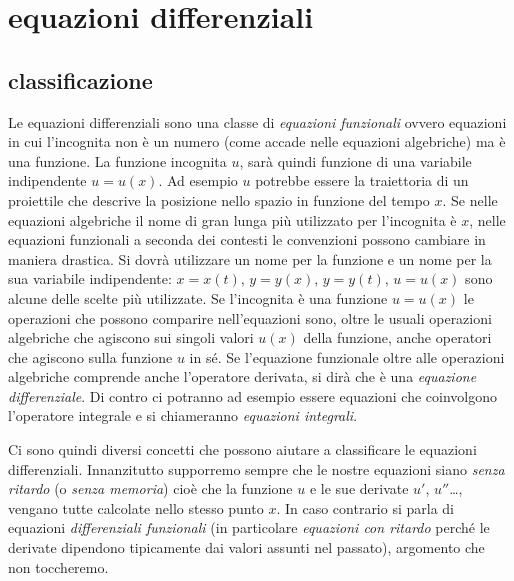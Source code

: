 \chapter{equazioni differenziali}
\label{ch:edo}

\section{classificazione}

Le equazioni differenziali sono una classe di \emph{equazioni funzionali}
ovvero
equazioni in cui l'incognita non è un numero (come accade nelle equazioni algebriche) ma è una funzione. La funzione incognita $u$, sarà quindi funzione di una variabile indipendente $u=u(x)$.
Ad esempio $u$ potrebbe essere la traiettoria di un proiettile che descrive la posizione nello spazio in funzione del tempo $x$. Se nelle equazioni algebriche il nome di gran lunga più utilizzato per l'incognita è $x$, nelle equazioni funzionali a seconda dei contesti le convenzioni possono cambiare in maniera drastica. Si dovrà utilizzare un nome per la funzione e un nome per la sua variabile indipendente: $x=x(t)$, $y=y(x)$, $y=y(t)$, $u=u(x)$ sono alcune delle scelte più utilizzate.
Se l'incognita è una funzione $u=u(x)$ le operazioni che possono comparire nell'equazioni sono,
oltre le usuali operazioni algebriche che agiscono sui singoli valori $u(x)$ della funzione,
anche operatori che agiscono sulla funzione $u$ in sé.
Se l'equazione funzionale oltre alle operazioni algebriche comprende anche
l'operatore derivata, si dirà che è una %
%
\emph{equazione differenziale}.
Di contro ci potranno ad esempio essere equazioni che coinvolgono l'operatore integrale e si chiameranno
\emph{equazioni integrali}.

Ci sono quindi diversi concetti che possono aiutare a classificare le equazioni differenziali.
Innanzitutto supporremo sempre che le nostre equazioni siano \emph{senza ritardo}%
(o \emph{senza memoria})
cioè che la funzione $u$ e le sue derivate $u'$, $u''$\dots,
vengano tutte calcolate nello stesso punto $x$.
In caso contrario si parla di
equazioni \emph{differenziali funzionali} (in particolare \emph{equazioni con ritardo}
perché le derivate dipendono tipicamente dai valori assunti nel passato),
argomento che non toccheremo.

